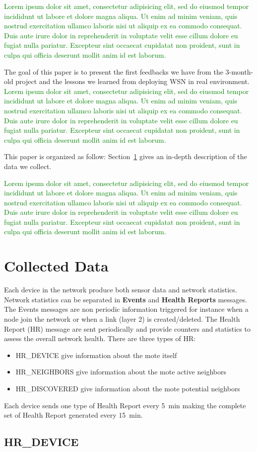 \documentclass{sig-alternate}
\newcommand{\lorem}               {\textcolor{green}{Lorem ipsum dolor sit amet, consectetur adipisicing elit, sed do eiusmod tempor incididunt ut labore et dolore magna aliqua. Ut enim ad minim veniam, quis nostrud exercitation ullamco laboris nisi ut aliquip ex ea commodo consequat. Duis aute irure dolor in reprehenderit in voluptate velit esse cillum dolore eu fugiat nulla pariatur. Excepteur sint occaecat cupidatat non proident, sunt in culpa qui officia deserunt mollit anim id est laborum.}}
\begin{document}
\lorem


The goal of this paper is to present the first feedbacks we have from the 3-month-old project and the lessons we learned from deploying WSN in real environment.
\lorem

This paper is organized as follow:
Section~\ref{sec:collected} gives an in-depth description of the data we collect.

\lorem

\section{Collected Data}
\label{sec:collected}


Each device in the network produce both sensor data and network statistics.
Network statistics can be separated in \textbf{Events} and \textbf{Health Reports} messages.
The Events messages are non periodic information triggered for instance when a node join the network or when a link (layer 2) is created/deleted.
The Health Report (HR) message are sent periodically and provide counters and statistics to assess the overall network health.
There are three types of HR:
\begin{itemize}
  \item HR\_DEVICE give information about the mote itself
  \item HR\_NEIGHBORS give information about the mote active neighbors
  \item HR\_DISCOVERED give information about the mote potential neighbors
\end{itemize}
Each device sends one type of Health Report every 5~min making the complete set of Health Report generated every 15~min.

\subsection{HR\_DEVICE}
\end{document}

